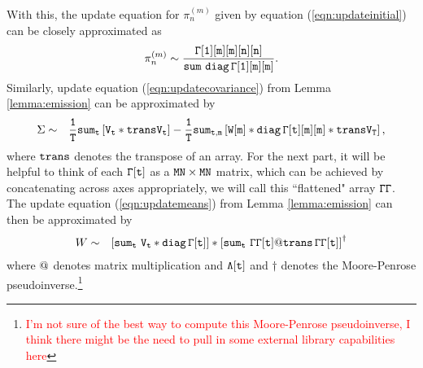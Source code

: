 \documentclass{amsart}
\begin{document}
With this, the update equation for $\pi_n^{(m)}$ given by 
equation (\ref{eqn:updateinitial}) can be closely approximated as 
\begin{eqnarray}\label{eqn:updateinitialapprox}
\pi_n^{(m)} \sim\frac{{\tt \Gamma[1][m][m][n][n]}}{{\tt sum 
\,\,diag\,\Gamma[1][m][m]}}.
\end{eqnarray} 
Similarly, update equation 
(\ref{eqn:updatecovariance}) from Lemma \ref{lemma:emission} can be approximated by 
\begin{eqnarray}\label{eqn:updatecovarianceapprox}
\Sigma & \sim& 
{\tt\frac{1}{T}}
{\tt sum_t}
\left[
{\tt V_t*transV_t}
\right] - 
{\tt\frac{1}{T}}
{\tt sum_{t,m} }
\left[
{\tt W[m] *diag\,\Gamma[t][m][m]*trans V_T}
\right],
\end{eqnarray}
where ${\tt trans}$ denotes the transpose of an array.  For the next 
part, it will be helpful to think of each ${\tt \Gamma[t]}$ as a ${\tt 
MN\times MN}$ matrix, which can be achieved by concatenating across axes 
appropriately, we will call this ``flattened" array ${\tt \Gamma\Gamma}$.  
The update equation (\ref{eqn:updatemeans}) from Lemma 
\ref{lemma:emission} can then be 
approximated by 
\begin{eqnarray}\label{eqn:updatemeansapprox}
W & \sim & \left[{\tt sum_t\,\, V_t *diag\,\Gamma[t]}\right] * 
\left[{\tt sum_t\,\,\Gamma\Gamma[t]@trans\,\Gamma\Gamma[t]}\right]^\dagger
\end{eqnarray}
where ${\tt @}$ denotes matrix multiplication and  
${\tt \Lambda[t]}$ and $\dagger$ denotes the Moore-Penrose 
pseudoinverse.\footnote{\textcolor{red}{I'm not sure of the best way to 
compute this Moore-Penrose pseudoinverse, I think there might be the need to pull in some external 
library capabilities here}}
\end{document}

